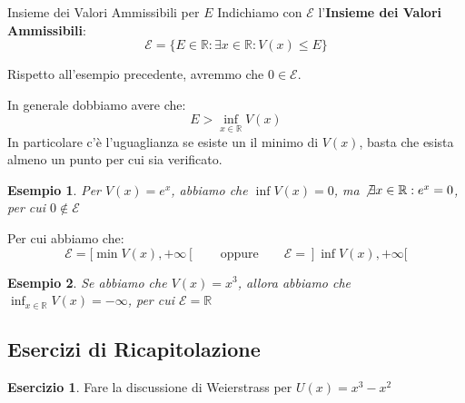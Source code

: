 \documentclass[11pt,a4paper,twoside]{article}
\newtheorem{es}{Esempio}
\theoremstyle{definition}
\newtheorem{ese}{Esercizio}[section]
\begin{document}
\begin{defn}{Insieme dei Valori Ammissibili per $E$}{}
	Indichiamo con $\mathscr E$ l'\textbf{Insieme dei Valori Ammissibili}:
	\[ \mathscr E = \{E \in \mathbb R: \exists x \in \mathbb R: V(x)\leq E\} \]
\end{defn}

Rispetto all'esempio precedente, avremmo che $0 \in \mathscr E$.

In generale dobbiamo avere che:
\[ E > \inf_{x \in \mathbb R}V(x) \]
In particolare c'è l'uguaglianza se esiste un il minimo di $V(x)$, basta che esista almeno un punto per cui sia verificato.

\begin{es}
	Per $V(x) = e^x$, abbiamo che $\inf V(x)=0$, ma $\not \exists x \in \mathbb R: e^x = 0$, per cui $0 \not \in \mathscr E$
\end{es}

Per cui abbiamo che:
\[ \mathscr E = [\min V(x), + \infty[\qquad \text{oppure} \qquad \mathscr E = ]\inf V(x), + \infty[ \]

\begin{es}
	Se abbiamo che $V(x) = x^3$, allora abbiamo che $\inf_{x \in \mathbb R}V(x) = - \infty$, per cui $\mathscr E = \mathbb R$
\end{es}

\subsection{Esercizi di Ricapitolazione}

\begin{ese}
	Fare la discussione di Weierstrass per $U(x) = x^3 - x^2$
\end{ese}
\end{document}
